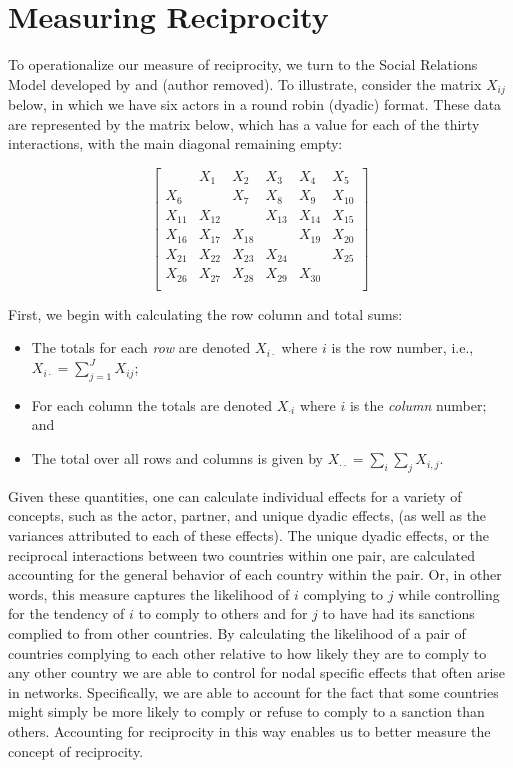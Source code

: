 \section*{Measuring Reciprocity}

To operationalize our measure of reciprocity, we turn to the Social Relations Model developed by \citet{kenny1994interpersonal} and (author removed). To illustrate, consider the matrix $X_{ij}$ below, in which we have six actors in a round robin (dyadic) format. These data are represented by the matrix below, which has a value for each of the thirty interactions, with the main diagonal remaining empty:

\singlespacing
\[
\left[
\begin{array}{cccccc}
 & X_{1}  & X_{2}  & X_{3} & X_{4} & X_{5} \\
X_{6}  &  & X_{7}  & X_{8} & X_{9} & X_{10} \\
X_{11}  & X_{12}  &    & X_{13} & X_{14} & X_{15} \\
X_{16}  & X_{17}  & X_{18}  &  & X_{19} & X_{20} \\
X_{21}  & X_{22}  & X_{23}  & X_{24} &   & X_{25} \\
X_{26}  & X_{27}  & X_{28}  & X_{29} & X_{30} &   \\
\end{array}
\right]
\]

\doublespacing
First, we begin with calculating the row column and total sums:

\begin{itemize}
	\item The totals for each \emph{ row} are denoted $X_{i \cdot}$ where $i$ is the row number, i.e.,
	~\\
	$X_{i \cdot} = \sum_{j=1}^{J} X_{ij}$;
	\item For each column the totals are denoted
	 $X_{\cdot i}$ where $i$ is the \emph{column} number; and 
	 \item The total over all rows and columns is given by $X_{\cdot \cdot} = \sum_i \sum_j X_{i,j}$.
 \end{itemize}
 
Given these quantities, one can calculate individual effects for a variety of concepts, such as the actor, partner, and unique dyadic effects, (as well as the variances attributed to each of these effects). The unique dyadic effects, or the reciprocal interactions between two countries within one pair, are calculated accounting for the general behavior of each country within the pair. Or, in other words, this measure captures the likelihood of $i$ complying to $j$ while controlling for the tendency of $i$ to comply to others and for $j$ to have had its sanctions complied to from other countries. By calculating the likelihood of a pair of countries complying to each other relative to how likely they are to comply to any other country we are able to control for nodal specific effects that often arise in networks. Specifically, we are able to account for the fact that some countries might simply be more likely to comply or refuse to comply to a sanction than others. Accounting for reciprocity in this way enables us to better measure the concept of reciprocity. 

